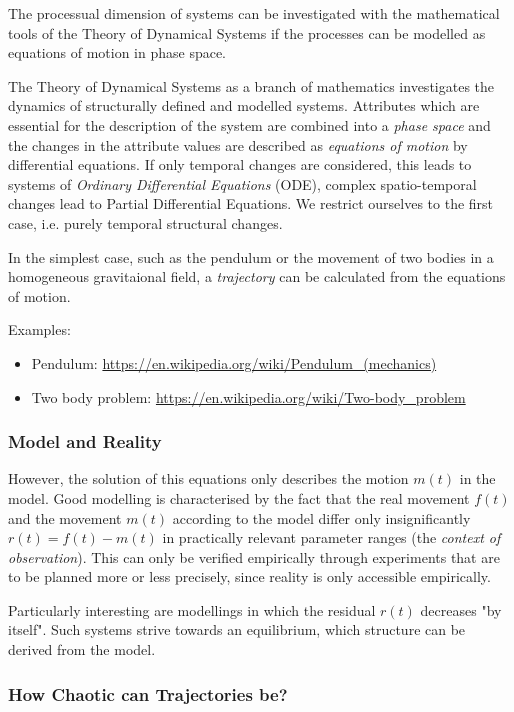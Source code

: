 \documentclass[11pt,a4paper]{article}
\begin{document}
The processual dimension of systems can be investigated with the mathematical
tools of the Theory of Dynamical Systems if the processes can be modelled as
equations of motion in phase space.

The Theory of Dynamical Systems as a branch of mathematics investigates the
dynamics of structurally defined and modelled systems. Attributes which are
essential for the description of the system are combined into a \emph{phase
  space} and the changes in the attribute values are described as
\emph{equations of motion} by differential equations. If only temporal changes
are considered, this leads to systems of \emph{Ordinary Differential
  Equations} (ODE), complex spatio-temporal changes lead to Partial
Differential Equations. We restrict ourselves to the first case, i.e. purely
temporal structural changes.

In the simplest case, such as the pendulum or the movement of two bodies in a
homogeneous gravitaional field, a \emph{trajectory} can be calculated from the
equations of motion.

Examples:
\begin{itemize}
\item Pendulum: \url{https://en.wikipedia.org/wiki/Pendulum_(mechanics)}
\item Two body problem: \url{https://en.wikipedia.org/wiki/Two-body_problem}
\end{itemize}

\subsubsection*{Model and Reality}

However, the solution of this equations only describes the motion $m(t)$ in
the model. Good modelling is characterised by the fact that the real movement
$f(t)$ and the movement $m(t)$ according to the model differ only
insignificantly $r(t)=f(t)-m(t)$ in practically relevant parameter ranges (the
\emph{context of observation}). This can only be verified empirically through
experiments that are to be planned more or less precisely, since reality is
only accessible empirically.

Particularly interesting are modellings in which the residual $r(t)$ decreases
"by itself". Such systems strive towards an equilibrium, which structure can
be derived from the model.

\subsubsection*{How Chaotic can Trajectories be?} 
\end{document}
